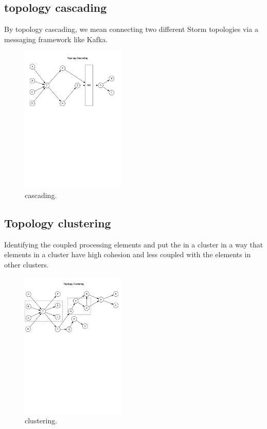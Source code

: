 \subsection{topology cascading}

By topology cascading, we mean connecting two different Storm topologies via a messaging framework like Kafka.

\begin{figure}[H]
	\begin{center}
		\includegraphics[width=5cm]{images/cascading}
		\caption{cascading.}
		\label{fig:cascading}
	\end{center}
\end{figure}

\subsection{Topology clustering}
Identifying the coupled processing elements and put the in a cluster in a way that elements in a cluster have high cohesion and less coupled with the elements in other clusters.

\begin{figure}[H]
	\begin{center}
		\includegraphics[width=5cm]{images/clustering}
		\caption{clustering.}
		\label{fig:clustering}
	\end{center}
\end{figure}

